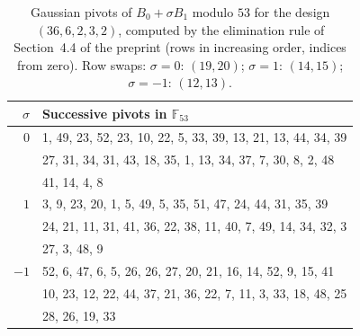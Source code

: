 \begin{table}[ht]
\centering
\small
\begin{tabular}{rl}
\hline
$\sigma$ & Successive pivots in $\mathbb{F}_{53}$ \\
\hline
$0$ & 1, 49, 23, 52, 23, 10, 22, 5, 33, 39, 13, 21, 13, 44, 34, 39 \\
 & 27, 31, 34, 31, 43, 18, 35, 1, 13, 34, 37, 7, 30, 8, 2, 48 \\
 & 41, 14, 4, 8 \\
\hline
$1$ & 3, 9, 23, 20, 1, 5, 49, 5, 35, 51, 47, 24, 44, 31, 35, 39 \\
 & 24, 21, 11, 31, 41, 36, 22, 38, 11, 40, 7, 49, 14, 34, 32, 3 \\
 & 27, 3, 48, 9 \\
\hline
$-1$ & 52, 6, 47, 6, 5, 26, 26, 27, 20, 21, 16, 14, 52, 9, 15, 41 \\
 & 10, 23, 12, 22, 44, 37, 21, 36, 22, 7, 11, 3, 33, 18, 48, 25 \\
 & 28, 26, 19, 33 \\
\hline
\end{tabular}
\caption{Gaussian pivots of $B_0+\sigma B_1$ modulo $53$ for the design $(36,6,2,3,2)$, computed by the elimination rule of Section~4.4 of the preprint (rows in increasing order, indices from zero). Row swaps: $\sigma=0$: $(19,20)$; $\sigma=1$: $(14,15)$; $\sigma=-1$: $(12,13)$.}
\label{tab:pivots53}
\end{table}
